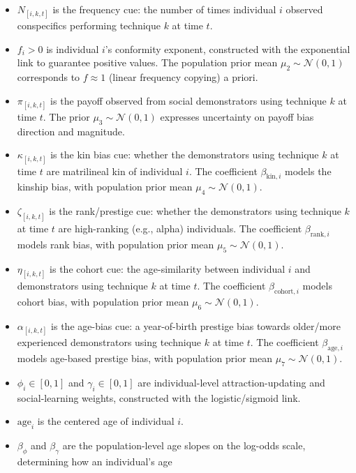 \documentclass[
  letterpaper,
  DIV=11,
  numbers=noendperiod]{scrartcl}
\providecommand{\tightlist}{%
  \setlength{\itemsep}{0pt}\setlength{\parskip}{0pt}}\usepackage{longtable,booktabs,array}
\begin{document}
\begin{itemize}
\tightlist
\item
  \(N_{[i,k,t]}\) is the frequency cue: the number of times individual
  \(i\) observed conspecifics performing technique \(k\) at time \(t\).
\item
  \(f_i > 0\) is individual \(i\)'s conformity exponent, constructed
  with the exponential link to guarantee positive values. The population
  prior mean \(\mu_2 \sim \mathcal{N}(0,1)\) corresponds to
  \(f \approx 1\) (linear frequency copying) a priori.
\item
  \(\pi_{[i,k,t]}\) is the payoff observed from social demonstrators
  using technique \(k\) at time \(t\). The prior
  \(\mu_3 \sim \mathcal{N}(0,1)\) expresses uncertainty on payoff bias
  direction and magnitude.
\item
  \(\kappa_{[i,k,t]}\) is the kin bias cue: whether the demonstrators
  using technique \(k\) at time \(t\) are matrilineal kin of individual
  \(i\). The coefficient \(\beta_{\text{kin},i}\) models the kinship
  bias, with population prior mean \(\mu_4 \sim \mathcal{N}(0,1)\).
\item
  \(\zeta_{[i,k,t]}\) is the rank/prestige cue: whether the
  demonstrators using technique \(k\) at time \(t\) are high-ranking
  (e.g., alpha) individuals. The coefficient \(\beta_{\text{rank},i}\)
  models rank bias, with population prior mean
  \(\mu_5 \sim \mathcal{N}(0,1)\).
\item
  \(\eta_{[i,k,t]}\) is the cohort cue: the age-similarity between
  individual \(i\) and demonstrators using technique \(k\) at time
  \(t\). The coefficient \(\beta_{\text{cohort},i}\) models cohort bias,
  with population prior mean \(\mu_6 \sim \mathcal{N}(0,1)\).
\item
  \(\alpha_{[i,k,t]}\) is the age-bias cue: a year-of-birth prestige
  bias towards older/more experienced demonstrators using technique
  \(k\) at time \(t\). The coefficient \(\beta_{\text{age},i}\) models
  age-based prestige bias, with population prior mean
  \(\mu_7 \sim \mathcal{N}(0,1)\).
\item
  \(\phi_i \in [0, 1]\) and \(\gamma_i \in [0, 1]\) are individual-level
  attraction-updating and social-learning weights, constructed with the
  logistic/sigmoid link.
\item
  \(\text{age}_i\) is the centered age of individual \(i\).
\item
  \(\beta_{\phi}\) and \(\beta_{\gamma}\) are the population-level age
  slopes on the log-odds scale, determining how an individual's age

\end{itemize}
\end{document}
